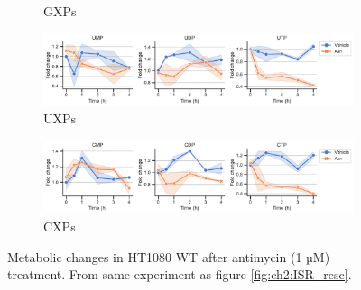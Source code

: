 \begin{figure}[ht]
\begin{subfigure}[b]{0.63\textwidth}
        \caption{GXPs}
        \label{fig:app_ch2:HT1080_Anti_gxp}
    \end{subfigure}
    \hfill
    \begin{subfigure}[b]{0.63\textwidth}
        \includegraphics[width=\textwidth]{figures/chap2/app/HT1080_Anti_uxp.pdf}
        \caption{UXPs}
        \label{fig:app_ch2:HT1080_Anti_uxp}
    \end{subfigure}
    \hfill
    \begin{subfigure}[b]{0.63\textwidth}
        \includegraphics[width=\textwidth]{figures/chap2/app/HT1080_Anti_cxp.pdf}
        \caption{CXPs}
        \label{fig:app_ch2:HT1080_Anti_cxp}
    \end{subfigure}
    \hfill
        \caption[Metabolic changes in HT1080 after antimycin treatment.]{
        Metabolic changes in HT1080 WT after antimycin (1 µM) treatment.
        From same experiment as figure \ref{fig:ch2:ISR_resc}.
        }
        \label{fig:app_ch2:HT1080_Anti_metab}
\end{figure}








